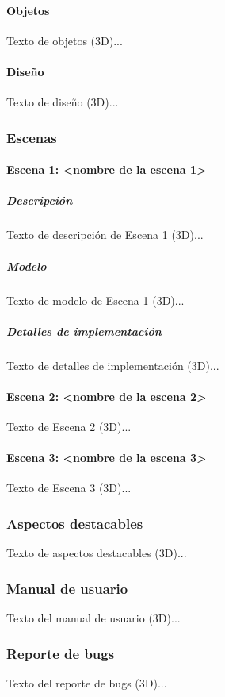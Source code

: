 \documentclass[12pt,a4paper,twoside,spanish]{article}      %
\begin{document}
\paragraph{Objetos}
Texto de objetos (3D)...

\paragraph{Diseño}
Texto de diseño (3D)...

\subsubsection{Escenas}
\paragraph{Escena 1: <nombre de la escena 1>}
\subparagraph{Descripción}
Texto de descripción de Escena 1 (3D)...

\subparagraph{Modelo}
Texto de modelo de Escena 1 (3D)...

\subparagraph{Detalles de implementación}
Texto de detalles de implementación (3D)...

\paragraph{Escena 2: <nombre de la escena 2>}
Texto de Escena 2 (3D)...

\paragraph{Escena 3: <nombre de la escena 3>}
Texto de Escena 3 (3D)...

\subsubsection{Aspectos destacables}
Texto de aspectos destacables (3D)...

\subsubsection{Manual de usuario}
Texto del manual de usuario (3D)...

\subsubsection{Reporte de bugs}
Texto del reporte de bugs (3D)...

\end{document}
